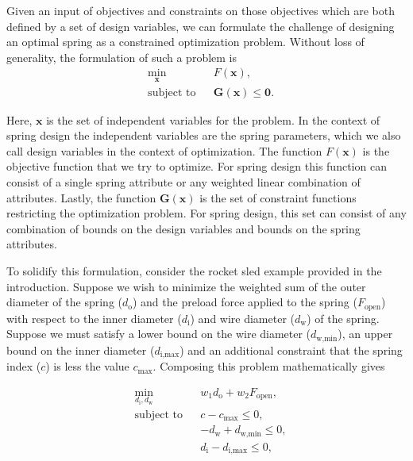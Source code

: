 \documentclass[10pt]{article}
\begin{document}
Given an input of objectives and constraints on those objectives which are both defined by a set of design variables, we can formulate the challenge of designing an optimal spring as a constrained optimization problem. Without loss of generality, the formulation of such a problem is
				\begin{equation*}
 					\begin{aligned}
 						& \underset{\mathbf{x}}{\text{min}}
 						& & F(\mathbf{x}), \\
 						& \text{subject to}
 						& & \mathbf{G}(\mathbf{x}) \le \mathbf{0}.
 					\end{aligned}
				\end{equation*}
				
Here, $\mathbf{x}$ is the set of independent variables for the problem. In the context of spring design the independent variables are the spring parameters, which we also call design variables in the context of optimization. The function $F(\mathbf{x})$ is the objective function that we try to optimize. For spring design this function can consist of a single spring attribute or any weighted linear combination of attributes. Lastly, the function $\mathbf{G}(\mathbf{x})$ is the set of constraint functions restricting the optimization problem. For spring design, this set can consist of any combination of bounds on the design variables and bounds on the spring attributes. 

To solidify this formulation, consider the rocket sled example provided in the introduction. Suppose we wish to minimize the weighted sum of the outer diameter of the spring ($d_{\text{o}}$) and the preload force applied to the spring ($F_{\text{open}}$) with respect to the inner diameter ($d_{\text{i}}$) and wire diameter ($d_{\text{w}}$) of the spring. Suppose we must satisfy a lower bound on the wire diameter ($d_{\text{w,min}}$), an upper bound on the inner diameter ($d_{\text{i,max}}$) and an additional constraint that the spring index ($c$) is less the value $c_{\text{max}}$. Composing this problem mathematically gives

				\begin{equation*}
 					\begin{aligned}
 						& \underset{d_{\text{i}}, d_{\text{w}}}{\text{min}}
 						& & w_{1}d_{\text{o}} + w_{2}F_{\text{open}}, \\
 						& \text{subject to}
						& & c - c_{\text{max}}\le 0, \\
						&
 						& & -d_{\text{w}} + d_{\text{w,min}}\le 0, \\
					 	&
						& & d_{\text{i}} - d_{\text{i,max}} \le 0,
					\end{aligned}
				\end{equation*}
\end{document}
